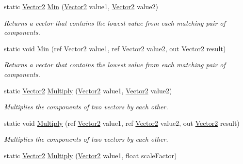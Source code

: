 \begin{DoxyCompactItemize}
static \hyperlink{structMicrosoft_1_1Xna_1_1Framework_1_1Vector2}{Vector2} \hyperlink{structMicrosoft_1_1Xna_1_1Framework_1_1Vector2_a4e20422b65ced3f288f6b5d92545a16a}{Min} (\hyperlink{structMicrosoft_1_1Xna_1_1Framework_1_1Vector2}{Vector2} value1, \hyperlink{structMicrosoft_1_1Xna_1_1Framework_1_1Vector2}{Vector2} value2)
\begin{DoxyCompactList}\small\item\em Returns a vector that contains the lowest value from each matching pair of components.\end{DoxyCompactList}\item 
static void \hyperlink{structMicrosoft_1_1Xna_1_1Framework_1_1Vector2_a01d598c3db36b89d543465365a5c174e}{Min} (ref \hyperlink{structMicrosoft_1_1Xna_1_1Framework_1_1Vector2}{Vector2} value1, ref \hyperlink{structMicrosoft_1_1Xna_1_1Framework_1_1Vector2}{Vector2} value2, out \hyperlink{structMicrosoft_1_1Xna_1_1Framework_1_1Vector2}{Vector2} result)
\begin{DoxyCompactList}\small\item\em Returns a vector that contains the lowest value from each matching pair of components.\end{DoxyCompactList}\item 
static \hyperlink{structMicrosoft_1_1Xna_1_1Framework_1_1Vector2}{Vector2} \hyperlink{structMicrosoft_1_1Xna_1_1Framework_1_1Vector2_ae5cded2422bfaef32bd82fe24da3e943}{Multiply} (\hyperlink{structMicrosoft_1_1Xna_1_1Framework_1_1Vector2}{Vector2} value1, \hyperlink{structMicrosoft_1_1Xna_1_1Framework_1_1Vector2}{Vector2} value2)
\begin{DoxyCompactList}\small\item\em Multiplies the components of two vectors by each other.\end{DoxyCompactList}\item 
static void \hyperlink{structMicrosoft_1_1Xna_1_1Framework_1_1Vector2_a367d91271fea62482aae8337d48e87c2}{Multiply} (ref \hyperlink{structMicrosoft_1_1Xna_1_1Framework_1_1Vector2}{Vector2} value1, ref \hyperlink{structMicrosoft_1_1Xna_1_1Framework_1_1Vector2}{Vector2} value2, out \hyperlink{structMicrosoft_1_1Xna_1_1Framework_1_1Vector2}{Vector2} result)
\begin{DoxyCompactList}\small\item\em Multiplies the components of two vectors by each other.\end{DoxyCompactList}\item 
static \hyperlink{structMicrosoft_1_1Xna_1_1Framework_1_1Vector2}{Vector2} \hyperlink{structMicrosoft_1_1Xna_1_1Framework_1_1Vector2_ad5702efe65b09f83c8c1f8bb9e841dd5}{Multiply} (\hyperlink{structMicrosoft_1_1Xna_1_1Framework_1_1Vector2}{Vector2} value1, float scale\+Factor)

\end{DoxyCompactItemize}
